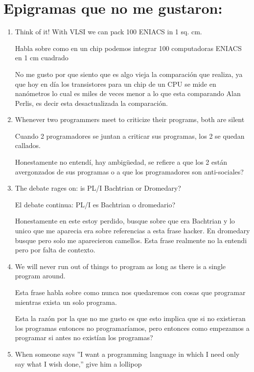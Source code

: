 \documentclass{article}
\begin{document}
\section{Epigramas que no me gustaron:}
\begin{enumerate}
    \item Think of it! With VLSI we can pack 100 ENIACS in 1 sq. cm.

    Habla sobre como en un chip podemos integrar 100 computadoras ENIACS en 1 cm cuadrado

    No me gusto por que siento que es algo vieja la comparación que realiza, ya que hoy en día los transistores para un chip de un CPU se mide en nanómetros lo cual es miles de veces menor a lo que esta comparando Alan Perlis, es decir esta desactualizada la comparación.

    \item Whenever two programmers meet to criticize their programs, both are silent

    Cuando 2 programadores se juntan a criticar sus programas, los 2 se quedan callados.

    Honestamente no entendí, hay ambigüedad, se refiere a que los 2 están avergonzados de sus programas o a que los programadores son anti-sociales?
    
    
    \item The debate rages on: is PL/I Bachtrian or Dromedary?

    El debate continua: PL/I es Bachtrian o dromedario?

    Honestamente en este estoy perdido, busque sobre que era Bachtrian y lo unico que me aparecia era sobre referencias a esta frase hacker. En dromedary busque pero solo me aparecieron camellos. Esta frase realmente no la entendi pero por falta de contexto.
    
    \item We will never run out of things to program as long as there is a single program around.

    Esta frase habla sobre como nunca nos quedaremos con cosas que programar mientras exista un solo programa.

    Esta la razón por la que no me gusto es que esto implica que si no existieran los programas entonces no programaríamos, pero entonces como empezamos a programar si antes no existían los programas?
    
    \item When someone says ”I want a programming language in which I need only say what I wish done,” give him a lollipop


\end{enumerate}
\end{document}
